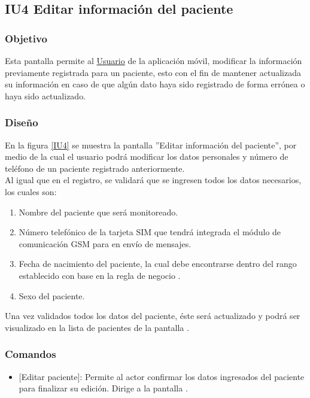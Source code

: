 \subsection{IU4 Editar información del paciente}

\subsubsection{Objetivo}
	
Esta pantalla permite al \hyperlink{actor:usuario}{Usuario} de la aplicación móvil, modificar la información previamente registrada para un paciente, esto con el fin de mantener actualizada su información en caso de que algún dato haya sido registrado de forma errónea o haya sido actualizado.

\subsubsection{Diseño}
En la figura \ref{IU4} se muestra la pantalla ''Editar información del paciente'', por medio de la cual el usuario podrá modificar los datos personales y número de teléfono de un paciente registrado anteriormente.\\

Al igual que en el registro, se validará que se ingresen todos los datos necesarios, los cuales son:
\begin{enumerate}
	\item Nombre del paciente que será monitoreado.
	\item Número telefónico de la tarjeta SIM que tendrá integrada el módulo de comunicación GSM para en envío de mensajes.
	\item Fecha de nacimiento del paciente, la cual debe encontrarse dentro del rango establecido con base en la regla de negocio .
	\item Sexo del paciente.
\end{enumerate}

Una vez validados todos los datos del paciente, éste será actualizado y podrá ser visualizado en la lista de pacientes de la pantalla .

    

\subsubsection{Comandos}
	\begin{itemize}
		\item \btnRegistrar{} [Editar paciente]: Permite al actor confirmar los datos ingresados del paciente para finalizar su edición. Dirige a la pantalla .
	\end{itemize}
\clearpage